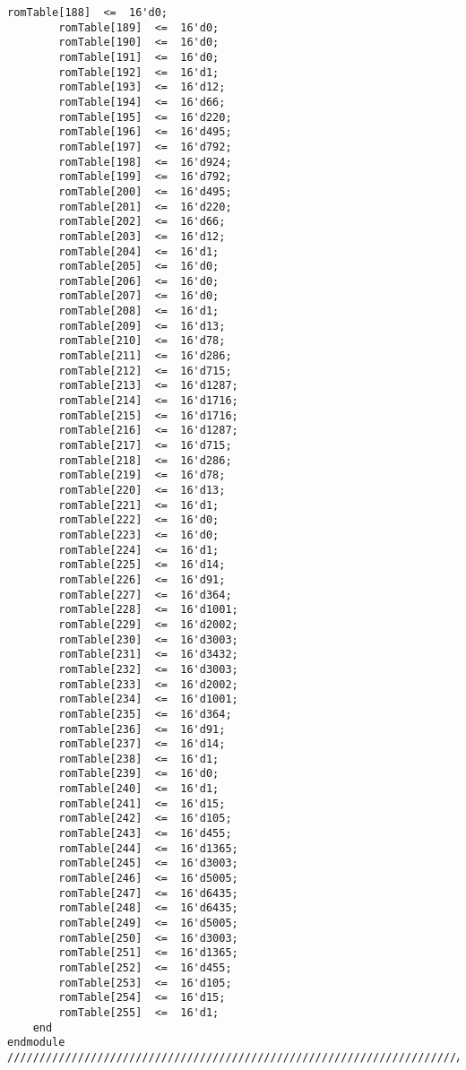 \begin{lstlisting}[style=verilog-style,basicstyle=\tiny]
		romTable[188]  <=  16'd0;
		romTable[189]  <=  16'd0;
		romTable[190]  <=  16'd0;
		romTable[191]  <=  16'd0;
		romTable[192]  <=  16'd1;
		romTable[193]  <=  16'd12;
		romTable[194]  <=  16'd66;
		romTable[195]  <=  16'd220;
		romTable[196]  <=  16'd495;
		romTable[197]  <=  16'd792;
		romTable[198]  <=  16'd924;
		romTable[199]  <=  16'd792;
		romTable[200]  <=  16'd495;
		romTable[201]  <=  16'd220;
		romTable[202]  <=  16'd66;
		romTable[203]  <=  16'd12;
		romTable[204]  <=  16'd1;
		romTable[205]  <=  16'd0;
		romTable[206]  <=  16'd0;
		romTable[207]  <=  16'd0;
		romTable[208]  <=  16'd1;
		romTable[209]  <=  16'd13;
		romTable[210]  <=  16'd78;
		romTable[211]  <=  16'd286;
		romTable[212]  <=  16'd715;
		romTable[213]  <=  16'd1287;
		romTable[214]  <=  16'd1716;
		romTable[215]  <=  16'd1716;
		romTable[216]  <=  16'd1287;
		romTable[217]  <=  16'd715;
		romTable[218]  <=  16'd286;
		romTable[219]  <=  16'd78;
		romTable[220]  <=  16'd13;
		romTable[221]  <=  16'd1;
		romTable[222]  <=  16'd0;
		romTable[223]  <=  16'd0;
		romTable[224]  <=  16'd1;
		romTable[225]  <=  16'd14;
		romTable[226]  <=  16'd91;
		romTable[227]  <=  16'd364;
		romTable[228]  <=  16'd1001;
		romTable[229]  <=  16'd2002;
		romTable[230]  <=  16'd3003;
		romTable[231]  <=  16'd3432;
		romTable[232]  <=  16'd3003;
		romTable[233]  <=  16'd2002;
		romTable[234]  <=  16'd1001;
		romTable[235]  <=  16'd364;
		romTable[236]  <=  16'd91;
		romTable[237]  <=  16'd14;
		romTable[238]  <=  16'd1;
		romTable[239]  <=  16'd0;
		romTable[240]  <=  16'd1;
		romTable[241]  <=  16'd15;
		romTable[242]  <=  16'd105;
		romTable[243]  <=  16'd455;
		romTable[244]  <=  16'd1365;
		romTable[245]  <=  16'd3003;
		romTable[246]  <=  16'd5005;
		romTable[247]  <=  16'd6435;
		romTable[248]  <=  16'd6435;
		romTable[249]  <=  16'd5005;
		romTable[250]  <=  16'd3003;
		romTable[251]  <=  16'd1365;
		romTable[252]  <=  16'd455;
		romTable[253]  <=  16'd105;
		romTable[254]  <=  16'd15;
		romTable[255]  <=  16'd1;
	end
endmodule
//////////////////////////////////////////////////////////////////////////////////
\end{lstlisting}


\newpage
